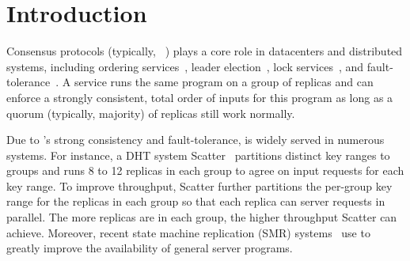 \section{Introduction} \label{sec:intro}

Consensus protocols (typically, 
\paxos~\cite{paxos:practical,paxos,paxos:simple,paxos:complex}) plays a core 
role in datacenters and distributed systems, including ordering 
services~\cite{ellis:thesis,manos:hotdep10,scatter:sosp11}, leader 
election~\cite{zookeeper}, lock services~\cite{chubby:osdi}, and 
fault-tolerance~\cite{eve:osdi12,rex:eurosys14,crane:sosp15}. A \paxos service 
runs the same program on a group of replicas and can enforce a strongly 
consistent, total order of inputs for this program as long as a quorum 
(typically, majority) of replicas still work normally.

Due to \paxos's strong consistency and fault-tolerance, \paxos is widely served 
in numerous systems. For instance, a DHT system Scatter~\cite{scatter:sosp11} 
partitions distinct key ranges to \paxos groups and runs 8 to 12 replicas 
in each group to agree on input requests for each key range. To improve 
throughput, Scatter further partitions the per-group key range for the replicas 
in each group so that each replica can server requests in parallel. The more 
replicas are in each group, the higher throughput Scatter can achieve. Moreover, 
recent state machine replication (SMR) systems~\cite{ crane:sosp15, eve:osdi12, 
rex:eurosys14} use \paxos to greatly improve the availability of general server 
programs.






